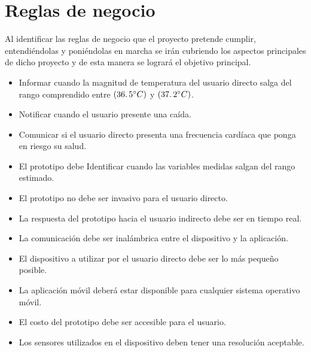 \section{Reglas de negocio}

Al identificar las reglas de negocio que el proyecto pretende cumplir, entendiéndolas y poniéndolas en marcha se irán cubriendo los aspectos principales de dicho proyecto y de esta manera se logrará el objetivo principal. \\ 

\begin{itemize}
	\item Informar cuando la magnitud de temperatura del usuario directo salga del rango comprendido entre $(36\ldotp5^{\circ}C)$ y $(37\ldotp2^{\circ}C)$.
	\item Notificar cuando el usuario presente una caída.
	\item Comunicar si el usuario directo presenta una frecuencia cardíaca que ponga en riesgo su salud.
	\item El prototipo debe Identificar cuando las variables medidas salgan del rango estimado.
	\item El prototipo no debe ser invasivo para el usuario directo.
	\item La respuesta del prototipo hacia el usuario indirecto debe ser en tiempo real.
	\item La comunicación debe ser inalámbrica entre el dispositivo y la aplicación.
	\item El dispositivo a utilizar por el usuario directo debe ser lo más pequeño posible.
	\item La aplicación móvil deberá estar disponible para cualquier sistema operativo móvil.
	\item El costo del prototipo debe ser accesible para el usuario.
	\item Los sensores utilizados en el dispositivo deben tener una resolución aceptable.
\end{itemize}